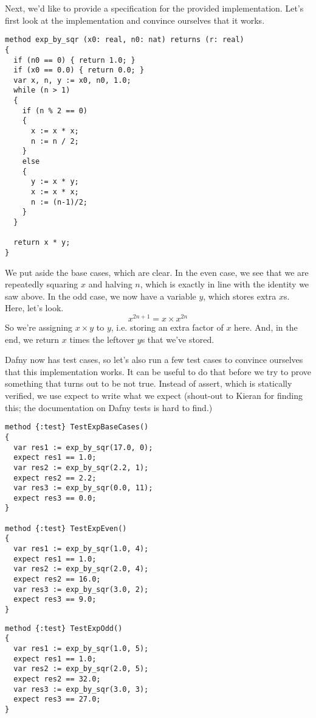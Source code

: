 \documentclass[11pt]{article}
\begin{document}
Next, we'd like to provide a specification for the provided implementation. Let's first look at the implementation and convince ourselves that it works.
\begin{lstlisting}[language=dafny]
method exp_by_sqr (x0: real, n0: nat) returns (r: real)
{
  if (n0 == 0) { return 1.0; }
  if (x0 == 0.0) { return 0.0; }
  var x, n, y := x0, n0, 1.0;
  while (n > 1)
  {
    if (n % 2 == 0)
    {
      x := x * x;
      n := n / 2;
    }
    else
    {
      y := x * y;
      x := x * x;
      n := (n-1)/2;
    }
  }

  return x * y;
}
\end{lstlisting}
We put aside the base cases, which are clear.
In the even case, we see that we are repeatedly squaring $x$ and halving $n$, which is exactly in line with the identity we saw above.
In the odd case, we now have a variable $y$, which stores extra $x$s. Here, let's look.
\[ x^{2n+1} = x \times x^{2n} \]
So we're assigning $x \times y$ to $y$, i.e. storing an extra factor of $x$ here. And, in the end, we return $x$ times the leftover $y$s
that we've stored.

Dafny now has test cases, so let's also run a few test cases to convince ourselves that this implementation works.
It can be useful to do that before we try to prove something that turns out to be not true. Instead of \textsf{assert},
which is statically verified, we use \textsf{expect} to write what we expect (shout-out to Kieran for finding this; the documentation on Dafny tests
is hard to find.)

  \begin{minipage}{.45\textwidth}
\begin{lstlisting}[language=dafny]
method {:test} TestExpBaseCases()
{
  var res1 := exp_by_sqr(17.0, 0);
  expect res1 == 1.0;
  var res2 := exp_by_sqr(2.2, 1);
  expect res2 == 2.2;
  var res3 := exp_by_sqr(0.0, 11);
  expect res3 == 0.0;
}

method {:test} TestExpEven()
{
  var res1 := exp_by_sqr(1.0, 4);
  expect res1 == 1.0;
  var res2 := exp_by_sqr(2.0, 4);
  expect res2 == 16.0;
  var res3 := exp_by_sqr(3.0, 2);
  expect res3 == 9.0;
}
\end{lstlisting}
\end{minipage}
  \begin{minipage}{.45\textwidth}
\begin{lstlisting}[language=dafny]
method {:test} TestExpOdd()
{
  var res1 := exp_by_sqr(1.0, 5);
  expect res1 == 1.0;
  var res2 := exp_by_sqr(2.0, 5);
  expect res2 == 32.0;
  var res3 := exp_by_sqr(3.0, 3);
  expect res3 == 27.0;
}
\end{lstlisting}
  \end{minipage}
\end{document}
